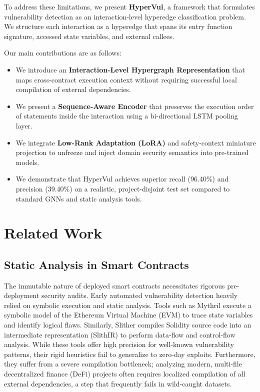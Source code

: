 \documentclass[conference]{IEEEtran}
\begin{document}
To address these limitations, we present \textbf{HyperVul}, a framework that formulates vulnerability detection as an interaction-level hyperedge classification problem. We structure each interaction as a hyperedge that spans its entry function signature, accessed state variables, and external callees. 

Our main contributions are as follows:
\begin{itemize}
    \item We introduce an \textbf{Interaction-Level Hypergraph Representation} that maps cross-contract execution context without requiring successful local compilation of external dependencies.
    \item We present a \textbf{Sequence-Aware Encoder} that preserves the execution order of statements inside the interaction using a bi-directional LSTM pooling layer.
    \item We integrate \textbf{Low-Rank Adaptation (LoRA)} and safety-context miniature projection to unfreeze and inject domain security semantics into pre-trained models.
    \item We demonstrate that HyperVul achieves superior recall (96.40\%) and precision (39.40\%) on a realistic, project-disjoint test set compared to standard GNNs and static analysis tools.
\end{itemize}

\section{Related Work}

\subsection{Static Analysis in Smart Contracts}
The immutable nature of deployed smart contracts necessitates rigorous pre-deployment security audits. Early automated vulnerability detection heavily relied on symbolic execution and static analysis. Tools such as Mythril \cite{mythril} execute a symbolic model of the Ethereum Virtual Machine (EVM) to trace state variables and identify logical flaws. Similarly, Slither \cite{feist2019slither} compiles Solidity source code into an intermediate representation (SlithIR) to perform data-flow and control-flow analysis. While these tools offer high precision for well-known vulnerability patterns, their rigid heuristics fail to generalize to zero-day exploits. Furthermore, they suffer from a severe compilation bottleneck; analyzing modern, multi-file decentralized finance (DeFi) projects often requires localized compilation of all external dependencies, a step that frequently fails in wild-caught datasets.
\end{document}
